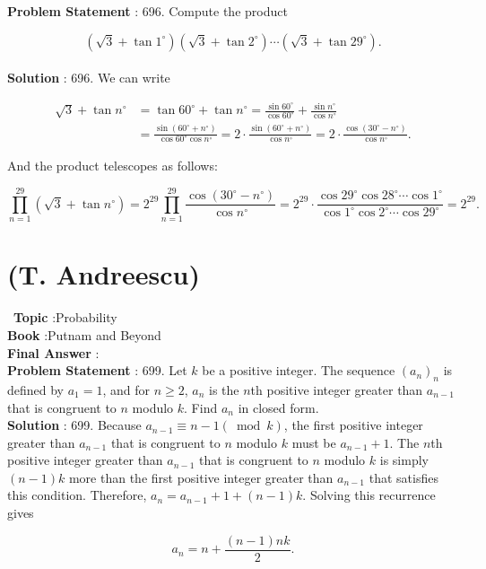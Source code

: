 \documentclass[10pt]{article}
\begin{document}
\textbf{Problem Statement} :
696. Compute the product

$$
\left(\sqrt{3}+\tan 1^{\circ}\right)\left(\sqrt{3}+\tan 2^{\circ}\right) \cdots\left(\sqrt{3}+\tan 29^{\circ}\right) .
$$
\\
\textbf{Solution} :
696. We can write

$$
\begin{aligned}
\sqrt{3}+\tan n^{\circ} &=\tan 60^{\circ}+\tan n^{\circ}=\frac{\sin 60^{\circ}}{\cos 60^{\circ}}+\frac{\sin n^{\circ}}{\cos n^{\circ}} \\
&=\frac{\sin \left(60^{\circ}+n^{\circ}\right)}{\cos 60^{\circ} \cos n^{\circ}}=2 \cdot \frac{\sin \left(60^{\circ}+n^{\circ}\right)}{\cos n^{\circ}}=2 \cdot \frac{\cos \left(30^{\circ}-n^{\circ}\right)}{\cos n^{\circ}} .
\end{aligned}
$$

And the product telescopes as follows:

$$
\prod_{n=1}^{29}\left(\sqrt{3}+\tan n^{\circ}\right)=2^{29} \prod_{n=1}^{29} \frac{\cos \left(30^{\circ}-n^{\circ}\right)}{\cos n^{\circ}}=2^{29} \cdot \frac{\cos 29^{\circ} \cos 28^{\circ} \cdots \cos 1^{\circ}}{\cos 1^{\circ} \cos 2^{\circ} \cdots \cos 29^{\circ}}=2^{29} .
$$

\section{(T. Andreescu)}\
\textbf{Topic} :Probability\\
\textbf{Book} :Putnam and Beyond\\
\textbf{Final Answer} :\\


\textbf{Problem Statement} :
699. Let $k$ be a positive integer. The sequence $\left(a_{n}\right)_{n}$ is defined by $a_{1}=1$, and for $n \geq 2$, $a_{n}$ is the $n$th positive integer greater than $a_{n-1}$ that is congruent to $n$ modulo $k$. Find $a_{n}$ in closed form.
\\
\textbf{Solution} :
699. Because $a_{n-1} \equiv n-1(\bmod k)$, the first positive integer greater than $a_{n-1}$ that is congruent to $n$ modulo $k$ must be $a_{n-1}+1$. The $n$th positive integer greater than $a_{n-1}$ that is congruent to $n$ modulo $k$ is simply $(n-1) k$ more than the first positive integer greater than $a_{n-1}$ that satisfies this condition. Therefore, $a_{n}=a_{n-1}+1+(n-1) k$. Solving this recurrence gives

$$
a_{n}=n+\frac{(n-1) n k}{2} .
$$
\end{document}
